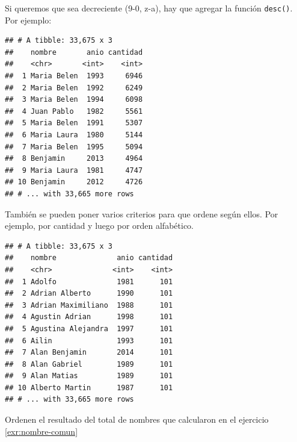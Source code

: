 \documentclass[]{book}
\newenvironment{Shaded}{\begin{snugshade}}{\end{snugshade}}
\newcommand{\KeywordTok}[1]{\textcolor[rgb]{0.13,0.29,0.53}{\textbf{#1}}}
\newcommand{\NormalTok}[1]{#1}
\newcommand{\OperatorTok}[1]{\textcolor[rgb]{0.81,0.36,0.00}{\textbf{#1}}}
\newcommand{\StringTok}[1]{\textcolor[rgb]{0.31,0.60,0.02}{#1}}
\theoremstyle{definition}
\theoremstyle{definition}
\theoremstyle{definition}
\theoremstyle{remark}
\let\BeginKnitrBlock\begin \let\EndKnitrBlock\end
\begin{document}
Si queremos que sea decreciente (9-0, z-a), hay que agregar la función
\texttt{desc()}. Por ejemplo:

\begin{Shaded}
\end{Shaded}

\begin{verbatim}
## # A tibble: 33,675 x 3
##    nombre       anio cantidad
##    <chr>       <int>    <int>
##  1 Maria Belen  1993     6946
##  2 Maria Belen  1992     6249
##  3 Maria Belen  1994     6098
##  4 Juan Pablo   1982     5561
##  5 Maria Belen  1991     5307
##  6 Maria Laura  1980     5144
##  7 Maria Belen  1995     5094
##  8 Benjamin     2013     4964
##  9 Maria Laura  1981     4747
## 10 Benjamin     2012     4726
## # ... with 33,665 more rows
\end{verbatim}

También se pueden poner varios criterios para que ordene según ellos.
Por ejemplo, por cantidad y luego por orden alfabético.

\begin{Shaded}
\end{Shaded}

\begin{verbatim}
## # A tibble: 33,675 x 3
##    nombre              anio cantidad
##    <chr>              <int>    <int>
##  1 Adolfo              1981      101
##  2 Adrian Alberto      1990      101
##  3 Adrian Maximiliano  1988      101
##  4 Agustin Adrian      1998      101
##  5 Agustina Alejandra  1997      101
##  6 Ailin               1993      101
##  7 Alan Benjamin       2014      101
##  8 Alan Gabriel        1989      101
##  9 Alan Matias         1989      101
## 10 Alberto Martin      1987      101
## # ... with 33,665 more rows
\end{verbatim}

\BeginKnitrBlock{exercise}[Orden de totales]
\protect\hypertarget{exr:ejercicio-10}{}{\label{exr:ejercicio-10}
{} }Ordenen el resultado del total de
nombres que calcularon en el ejercicio \ref{exr:nombre-comun}
\EndKnitrBlock{exercise}
\end{document}
